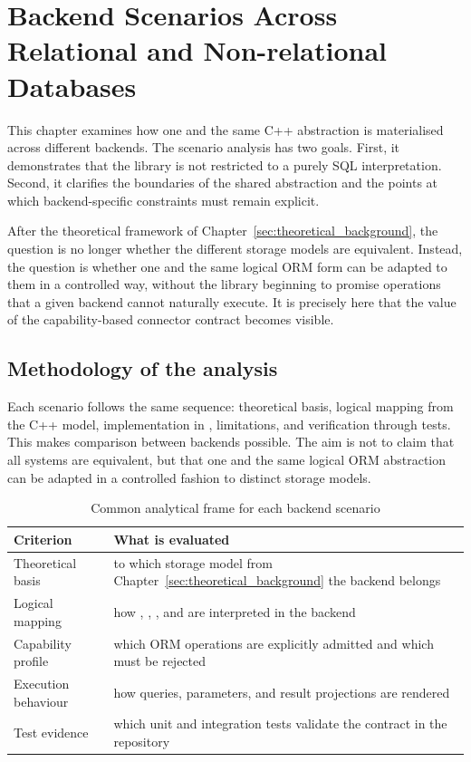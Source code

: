 \section{Backend Scenarios Across Relational and Non-relational Databases}
\label{sec:backend_scenarios}

This chapter examines how one and the same C++ abstraction is materialised across different backends. The scenario analysis has two goals. First, it demonstrates that the library is not restricted to a purely SQL interpretation. Second, it clarifies the boundaries of the shared abstraction and the points at which backend-specific constraints must remain explicit.

After the theoretical framework of Chapter~\ref{sec:theoretical_background}, the question is no longer whether the different storage models are equivalent. Instead, the question is whether one and the same logical ORM form can be adapted to them in a controlled way, without the library beginning to promise operations that a given backend cannot naturally execute. It is precisely here that the value of the capability-based connector contract becomes visible.

\subsection{Methodology of the analysis}

Each scenario follows the same sequence: theoretical basis, logical mapping from the C++ model, implementation in , limitations, and verification through tests. This makes comparison between backends possible. The aim is not to claim that all systems are equivalent, but that one and the same logical ORM abstraction can be adapted in a controlled fashion to distinct storage models.

\begin{table}[H]
\centering
\small
\caption{Common analytical frame for each backend scenario}
\label{tab:backend_analysis_frame}
\begin{tabularx}{\textwidth}{L{3.3cm}Y}
\toprule
\textbf{Criterion} & \textbf{What is evaluated} \\
\midrule
Theoretical basis & to which storage model from Chapter~\ref{sec:theoretical_background} the backend belongs \\
Logical mapping & how , , , and  are interpreted in the backend \\
Capability profile & which ORM operations are explicitly admitted and which must be rejected \\
Execution behaviour & how queries, parameters, and result projections are rendered \\
Test evidence & which unit and integration tests validate the contract in the repository \\
\bottomrule
\end{tabularx}
\end{table}

